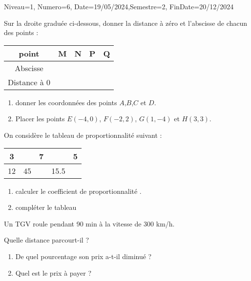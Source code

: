 \documentclass[a4paper,12pt]{article}
\begin{document}
\begin{Maquette}[DM]{Niveau=1, Numero=6, Date=19/05/2024,Semestre=2, FinDate=20/12/2024}
\begin{exercice}
Sur la droite graduée ci-dessous, donner la distance à zéro et l’abscisse de chacun des points   :


\begin{tabular}{|c|c|c|c|c|}
\hline 
point & M & N & P & Q \\ 
\hline 
Abscisse &  &  &  &  \\ 
\hline 
Distance à 0 &  &  &  &  \\ 
\hline 
\end{tabular} 
\begin{enumerate}
\item donner les coordonnées des points $A$,$B$,$C$ et $D$.
\item Placer les points $E(-4, 0)$, $F(-2, 2)$, $G(1, -4)$ et $H(3, 3)$.
\end{enumerate}
\begin{AffRepere}
\end{AffRepere}
\end{exercice}

\begin{exercice}
On considère le tableau de proportionnalité suivant :
\begin{tabular}{|c|c|c|c|c|}
\hline 
3 &  & 7 &  & 5 \\ 
\hline 
12 & 45 &  & 15.5 &  \\ 
\hline 
\end{tabular} 
\begin{enumerate}
\item calculer le coefficient de proportionnalité .
\item compléter le tableau 
\end{enumerate}
\end{exercice}


\begin{exercice}
Un TGV roule pendant 90 min  à la vitesse de 300 km/h.

Quelle distance parcourt-il ?
\end{exercice}

\begin{exercice}
\begin{enumerate}
\item  De quel pourcentage son prix a-t-il diminué ?
\item Quel est le prix à payer ?
\end{enumerate}
\end{exercice}


\end{Maquette}
\end{document}
